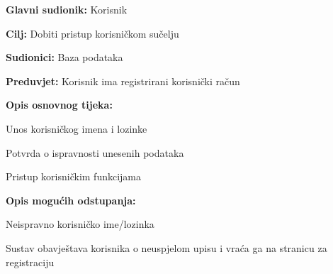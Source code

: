 					\noindent {}
					\begin{packed_item}
						
						\item \textbf{Glavni sudionik:} Korisnik
						\item \textbf{Cilj:} Dobiti pristup korisničkom sučelju 
						\item \textbf{Sudionici:} Baza podataka 
						\item \textbf{Preduvjet:} Korisnik ima registrirani korisnički račun
						\item \textbf{Opis osnovnog tijeka:}
						
						\item[] \begin{packed_enum}
							
							\item Unos korisničkog imena i lozinke 
							\item Potvrda o ispravnosti unesenih podataka 
							\item Pristup korisničkim funkcijama
						\end{packed_enum}
						
						\item  \textbf{Opis mogućih odstupanja:}
						
						\item[] \begin{packed_item}
							
							\item[2.a] Neispravno korisničko ime/lozinka
							\item[] \begin{packed_enum}
								
								\item Sustav obavještava korisnika o neuspjelom upisu i vraća ga na stranicu za registraciju
								
							\end{packed_enum}
							
						\end{packed_item}
					\end{packed_item}
					
